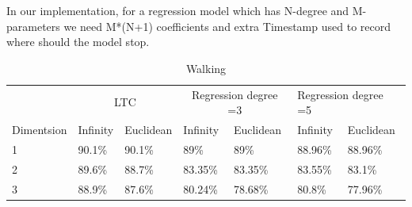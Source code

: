 \documentclass{report}
\begin{document}
In our implementation, for a regression model which has N-degree and M-parameters we need M*(N+1) coefficients and extra Timestamp used to record where should the model stop.

\begin{table}[]
\begin{tabular}{llllllll}
           & \multicolumn{2}{c}{LTC} & \multicolumn{2}{c}{Regression degree =3} & \multicolumn{3}{l}{Regression degree =5}          \\
Dimentsion & Infinity   & Euclidean  & Infinity           & Euclidean           & Infinity          & \multicolumn{2}{l}{Euclidean} \\
1    & 90.1\%     & 90.1\%     & 89\%    & 89\%     & 88.96\% & \multicolumn{2}{l}{88.96\%}   \\
2    & 89.6\%     & 88.7\%     & 83.35\% & 83.35\%  & 83.55\% & \multicolumn{2}{l}{83.1\%}    \\
3    & 88.9\%     & 87.6\%     & 80.24\% & 78.68\%  & 80.8\%  & \multicolumn{2}{l}{77.96\%}  
\end{tabular}
\caption{Walking}
\end{table}


%
%



\end{document}
